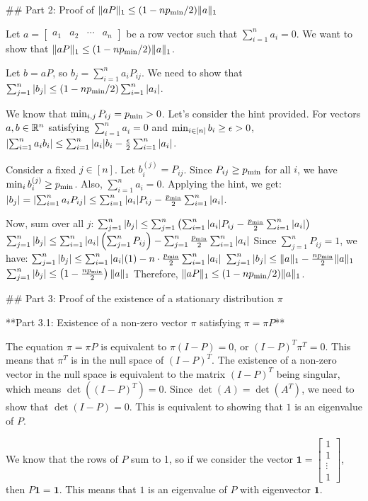 \begin{enumerate}
\begin{shaded}
## Part 2: Proof of $\|aP\|_1 \le (1 - np_{\textrm{min}} /2)\|a\|_1$

Let $a = \begin{bmatrix}a_1 & a_2 & \cdots & a_n\end{bmatrix}$ be a row vector such that $\sum_{i=1}^{n}a_i = 0$. We want to show that $\|aP\|_1 \le (1 - np_{\textrm{min}} /2)\|a\|_1$.

Let $b = aP$, so $b_j = \sum_{i=1}^n a_i P_{ij}$. We need to show that $\sum_{j=1}^n |b_j| \le (1 - np_{\textrm{min}} /2) \sum_{i=1}^n |a_i|$.

We know that $\min_{i,j} P_{ij} = p_{\textrm{min}} > 0$. Let's consider the hint provided. For vectors $a, b \in \mathbb{R}^n$ satisfying $\sum_{i=1}^{n}a_i = 0$ and $\min_{i\in[n]}b_i \ge \epsilon > 0$, $\left|\sum_{i=1}^na_ib_i\right|\le \sum_{i=1}^{n}|a_i|b_i - \frac{\epsilon}{2}\sum_{i=1}^{n}|a_i|$.

Consider a fixed $j \in [n]$. Let $b^{(j)}_i = P_{ij}$. Since $P_{ij} \ge p_{\textrm{min}}$ for all $i$, we have $\min_i b^{(j)}_i \ge p_{\textrm{min}}$. Also, $\sum_{i=1}^n a_i = 0$. Applying the hint, we get:
$|b_j| = \left|\sum_{i=1}^n a_i P_{ij}\right| \le \sum_{i=1}^n |a_i| P_{ij} - \frac{p_{\textrm{min}}}{2} \sum_{i=1}^n |a_i|$.

Now, sum over all $j$:
$\sum_{j=1}^n |b_j| \le \sum_{j=1}^n \left( \sum_{i=1}^n |a_i| P_{ij} - \frac{p_{\textrm{min}}}{2} \sum_{i=1}^n |a_i| \right)$
$\sum_{j=1}^n |b_j| \le \sum_{i=1}^n |a_i| \left( \sum_{j=1}^n P_{ij} \right) - \sum_{j=1}^n \frac{p_{\textrm{min}}}{2} \sum_{i=1}^n |a_i|$
Since $\sum_{j=1}^n P_{ij} = 1$, we have:
$\sum_{j=1}^n |b_j| \le \sum_{i=1}^n |a_i| (1) - n \cdot \frac{p_{\textrm{min}}}{2} \sum_{i=1}^n |a_i|$
$\sum_{j=1}^n |b_j| \le \|a\|_1 - \frac{np_{\textrm{min}}}{2} \|a\|_1$
$\sum_{j=1}^n |b_j| \le \left(1 - \frac{np_{\textrm{min}}}{2}\right) \|a\|_1$
Therefore, $\|aP\|_1 \le (1 - np_{\textrm{min}} /2)\|a\|_1$.

## Part 3: Proof of the existence of a stationary distribution $\pi$

**Part 3.1: Existence of a non-zero vector $\pi$ satisfying $\pi = \pi P$**

The equation $\pi = \pi P$ is equivalent to $\pi (I - P) = 0$, or $(I - P)^T \pi^T = 0$. This means that $\pi^T$ is in the null space of $(I - P)^T$. The existence of a non-zero vector in the null space is equivalent to the matrix $(I - P)^T$ being singular, which means $\det((I - P)^T) = 0$. Since $\det(A) = \det(A^T)$, we need to show that $\det(I - P) = 0$. This is equivalent to showing that $1$ is an eigenvalue of $P$.

We know that the rows of $P$ sum to 1, so if we consider the vector $\mathbf{1} = \begin{bmatrix} 1 \\ 1 \\ \vdots \\ 1 \end{bmatrix}$, then $P\mathbf{1} = \mathbf{1}$. This means that $1$ is an eigenvalue of $P$ with eigenvector $\mathbf{1}$.


\end{shaded}
\end{enumerate}
